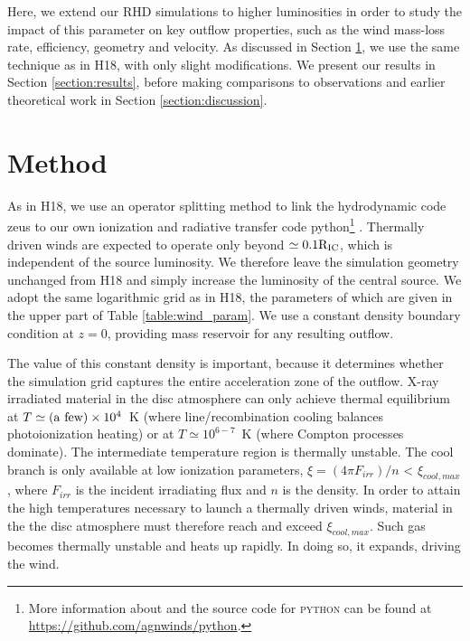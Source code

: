 \documentclass[a4paper,fleqn,usenatbib]{mnras}
\begin{document}
Here, we extend our RHD simulations to higher luminosities in order to
study the impact of this parameter on key outflow properties, such as
the wind mass-loss rate, efficiency, geometry and velocity. 
As discussed in Section \ref{section:method}, we  use the same
technique as in H18, with only slight modifications. We present
our results in Section \ref{section:results}, before making comparisons
to observations and earlier theoretical work in Section
\ref{section:discussion}.

\section{Method }
\label{section:method}

As in H18, we use an operator splitting method to link the hydrodynamic code {\sc zeus} 
\citep[][extended by \citealt{2000ApJ...543..686P}]{1992ApJS...80..753S} to our own ionization and
 radiative transfer code {\sc python}\footnote{More information about and the source code for 
 \textsc{python} can be found at \url{https://github.com/agnwinds/python}.} \citep[][extended by 
  \citealt{2005MNRAS.363..615S}, \citealt{,2013MNRAS.436.1390H} and
 \citealt{2015MNRAS.450.3331M}]{2002ApJ...579..725L}. 
 Thermally driven winds are expected to operate only beyond $\simeq 0.1 \rm{R_{IC}}$, which is
 independent of the source luminosity. We therefore leave the simulation geometry unchanged
from H18 and simply increase the luminosity of the central source. We
adopt the same logarithmic grid as in H18, the parameters of which are
given in the upper part of Table \ref{table:wind_param}. We use a constant 
density boundary condition at $z = 0$, providing mass reservoir for
any resulting outflow.

The value of this constant density is important, because it determines
whether the simulation grid captures the entire acceleration zone of
the outflow. X-ray irradiated
material in the disc atmosphere can only achieve thermal equilibrium
at $T \simeq ({\rm a~few}) \times 10^4$~K (where line/recombination
cooling balances photoionization heating) or at $T \simeq 10^{6-7}$~K
(where Compton processes dominate). The intermediate temperature
region is thermally unstable. The cool branch is only available at low 
ionization parameters, $\xi = (4\pi F_{irr}) / n$ < $\xi_{cool,max}$,
where $F_{irr}$ is the incident irradiating flux and $n$ is the
density. In order to attain the high temperatures necessary to launch a
thermally driven winds, material in the the disc atmosphere must
therefore reach and exceed $\xi_{cool,max}$. Such gas becomes
thermally unstable and heats up rapidly. In doing so, it expands,
driving the wind. 
\end{document}
